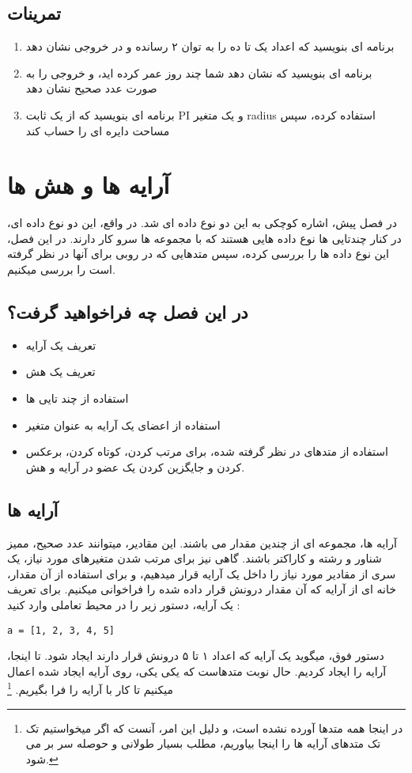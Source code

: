 \documentclass[11pt]{article}
\begin{document}
\subsection{تمرینات}
\begin{enumerate}
\item برنامه ای بنویسید که اعداد یک تا ده را به توان ۲ رسانده و در خروجی نشان دهد
\item برنامه ای بنویسید که نشان دهد شما چند روز عمر کرده اید، و خروجی را به صورت عدد صحیح نشان دهد
\item برنامه ای بنویسید که از یک ثابت PI و یک متغیر radius استفاده کرده، سپس مساحت دایره ای را حساب کند
\end{enumerate}
\newpage{}
\section{آرایه ها و هش ها}
در فصل پیش، اشاره کوچکی به این دو نوع داده ای شد. در واقع، این دو نوع داده ای، در کنار چندتایی ها
نوع داده هایی هستند که با مجموعه ها سرو کار دارند. در این فصل، این نوع داده ها را بررسی کرده، سپس متدهایی که در روبی برای آنها در نظر گرفته است را بررسی میکنیم. 
\subsection{در این فصل چه فراخواهید گرفت؟}
\begin{itemize}
\item تعریف یک آرایه
\item تعریف یک هش
\item استفاده از چند تایی ها
\item استفاده از اعضای یک آرایه به عنوان متغیر
\item استفاده از متدهای در نظر گرفته شده، برای مرتب کردن، کوتاه کردن، برعکس کردن و جایگزین کردن یک عضو در آرایه و هش.
\end{itemize}
\subsection{آرایه ها}
آرایه ها، مجموعه ای از چندین مقدار می باشند. این مقادیر، میتوانند عدد صحیح، ممیز شناور و رشته و کاراکتر باشند. گاهی نیز برای مرتب شدن متغیرهای مورد نیاز، یک سری از مقادیر مورد نیاز را داخل یک آرایه قرار میدهیم، و برای استفاده از آن مقدار، خانه ای از آرایه که آن مقدار درونش قرار داده شده را فراخوانی میکنیم. برای تعریف یک آرایه، دستور زیر را در محیط تعاملی وارد کنید :
\begin{latin}
\begin{verbatim}
a = [1, 2, 3, 4, 5]
\end{verbatim}
\end{latin}
دستور فوق، میگوید یک آرایه که اعداد ۱ تا ۵ درونش قرار دارند ایجاد شود. تا اینجا، آرایه را ایجاد کردیم. حال نوبت متدهاست که یکی یکی، روی آرایه ایجاد شده اعمال میکنیم تا کار با آرایه را فرا بگیریم.
\footnote{در اینجا همه متدها آورده نشده است، و دلیل این امر، آنست که اگر میخواستیم تک تک متدهای آرایه ها را اینجا بیاوریم، مطلب بسیار طولانی و حوصله سر بر می شود.}
\end{document}
